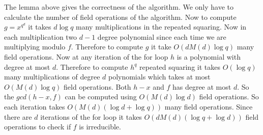 \documentclass[a4paper, 11pt]{article}
\begin{document}
{The lemma above gives the correctness of the algorithm. We only have to calculate the number of field operations of the algorithm. Now to compute $g=x^{q^d}$ it takes $d\log q$ many multiplications in the repeated squaring. Now in each multiplication two $d-1$ degree polynomial since each time we are multiplying modulo $f$. Therefore to compute $g$ it take $O(dM(d)\log q)$ many field operations. Now at any iteration of the for loop $h$ is a polynomial with degree at most $d$. Therefore to compute $h^q$ repeated squaring it takes $O(\log q)$ many multiplications of degree $d$ polynomials which takes at most $O(M(d)\log q)$ field operations. Both $h-x$ and $f$ has degree at most $d$. So the $gcd(h-x,f)$ can be computed using $O(M(d)\log d)$ field operations. So each iteration takes $O(M(d)(\log d+\log q))$ many field operations. Since there are $d$ iterations of the for loop it takes $O(dM(d)(\log q+\log d))$ field operations to check if $f$ is irreducible.
}
\end{document}
